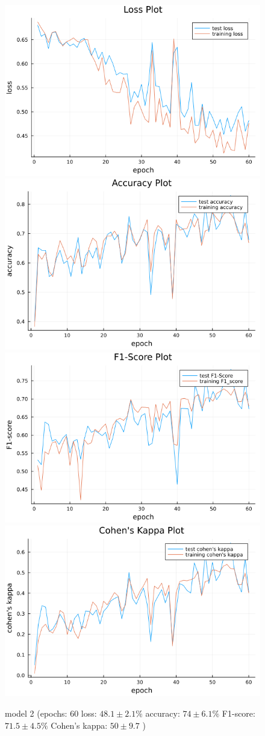 \documentclass[
a4paper, 
12pt,
grayscalebody, %
abstract=on,
twoside, BCOR10mm, 12pt, DIV13,headinclude, footexclude, final, abstracton, openright
]{ibireprt}
\numberwithin{equation}{chapter}
\numberwithin{table}{chapter}
\numberwithin{figure}{chapter}
\numberwithin{algorithm}{chapter}
\numberwithin{example}{chapter}
\numberwithin{example}{chapter}
\begin{document}
\begin{figure}
	\includegraphics[width=0.4\linewidth]{loss_png_final_1_2.png}\hfill
	\includegraphics[width=0.4\linewidth]{accuracy_png_final_1_2.png}
	\\[\smallskipamount]
	\includegraphics[width=0.4\linewidth]{f1_score_png_final_1_2.png}\hfill
	\includegraphics[width=0.4\linewidth]{cohens_kappa_png_final_1_2.png}
	\caption{model 2 (epochs: 60 loss: $48.1\pm2.1\% $ accuracy: $74\pm6.1\%$ F1-score: $71.5\pm4.5\%$  Cohen's kappa: $50\pm9.7$ )}
	\label{fig:model_2_60}
\end{figure}
\end{document}

